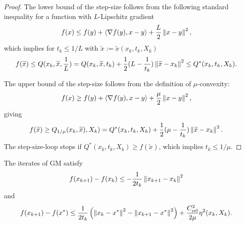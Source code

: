 \begin{proof}
The lower bound of the step-size follows from the following standard inequality for a function with $L$-Lipschitz gradient
%
\begin{align*}
f(x) \le f(y) + \langle\nabla f(y),x-y\rangle + \frac{L}{2}\left\|x-y\right\|^2,
\end{align*}
%
which implies for $t_k \le 1/L$ with $\widetilde{x}:=\widetilde{x}(x_k,t_k, X_{k})$
%
\begin{align*}
f(\widetilde{x}) \le Q(x_k, \widetilde{x}, \frac1L) = Q(x_k, \widetilde{x}, t_{k}) + \frac12(L-\frac{1}{t_k})\left\|\widetilde{x}-x_k\right\|^2 \le Q^*(x_k, t_k, X_{k}).
\end{align*}
%

The upper bound of the step-size follows from the definition of $\mu$-convexity:
%
\begin{align*}
f(x) \ge f(y) + \langle\nabla f(y),x-y\rangle + \frac{\mu}{2}\left\|x-y\right\|^2,
\end{align*}
%
giving
%
\begin{align*}
f(\widetilde{x}) \ge Q_{1/\mu}(x_k, \widetilde{x}), X_{k}) = Q^*(x_k, t_k, X_{k}) + \frac12(\mu-\frac{1}{t_k})\left\|\widetilde{x}-x_k\right\|^2. 
\end{align*}
%
The step-size-loop stops if  $Q^*(x_k, t_k, X_{k})\ge f(\widetilde{x})$, which implies $t_k\le 1/\mu$.


\end{proof}
%
\begin{lemma}\label{lemma:}
The iterates of GM satisfy
%
\begin{equation}\label{eq:gm:goodestimate1}
f(x_{k+1}) -f(x_k) \le -\frac{1}{2 t_k}\left\|x_{k+1}-x_k\right\|^2 
\end{equation}
%
and
%
\begin{equation}\label{eq:gm:goodestimate2}
f(x_{k+1}) -f(x^*) \le \frac{1}{2 t_k}\left(\left\|x_k-x^*\right\|^2 - \left\|x_{k+1}-x^*\right\|^2\right) +\frac{C_{\rm rel}^2}{2\mu}\eta^2(x_k,X_k).
\end{equation}
%
\end{lemma}
%
